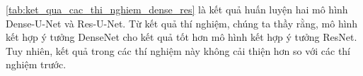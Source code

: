 	\autoref{tab:ket_qua_cac_thi_nghiem_dense_res} là kết quả huấn luyện hai mô hình Dense-U-Net và Res-U-Net. Từ kết quả thí nghiệm, chúng ta thầy rằng, mô hình kết hợp ý tưởng DenseNet cho kết quả tốt hơn mô hình kết hợp ý tưởng ResNet. Tuy nhiên, kết quả trong các thí nghiệm này không cải thiện hơn so với các thí nghiệm trước.
	\begin{table}[h!]
		\centering
		\caption{Kết quả các thí nghiệm DenseUNet và ResUNet.}
		\label{tab:ket_qua_cac_thi_nghiem_dense_res}
	\end{table}

